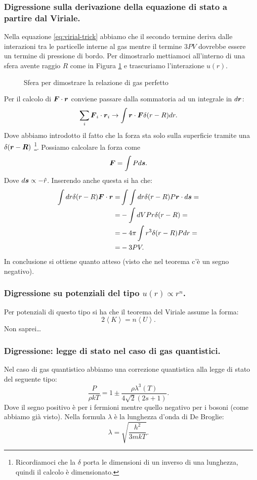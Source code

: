 \subsubsection{Digressione sulla derivazione della equazione di stato a partire dal Viriale.}
\label{subsubsec:Digressione sulla derivazione della equazione di stato a partire dal Viriale.}
Nella equazione \ref{eq:virial-trick} abbiamo che il secondo termine deriva dalle interazioni tra le particelle interne al gas mentre il termine $3PV$ dovrebbe essere un termine di pressione di bordo. Per dimostrarlo mettiamoci all'interno di una sfera avente raggio $R$ come in Figura \ref{fig:sfera-per-dimostrare-la-relazione-di-gas-perfetto} e trascuriamo l'interazione $u(r)$.
\begin{figure}[ht]
    \centering
    \caption{Sfera per dimostrare la relazione di gas perfetto}
    \label{fig:sfera-per-dimostrare-la-relazione-di-gas-perfetto}
\end{figure}
Per il calcolo di $\boldsymbol{F}\cdot\boldsymbol{r}$ conviene passare dalla sommatoria ad un integrale in $d \boldsymbol{r}$:
\[
	\sum_{i}^{} \boldsymbol{F}_i\cdot\boldsymbol{r}_{i} \to 
	\int\boldsymbol{r}\cdot\boldsymbol{F} \delta(r-R)dr
.\] 
Dove abbiamo introdotto il fatto che la forza sta solo sulla superficie tramite una $\delta(\boldsymbol{r}-\boldsymbol{R})$ \footnote{Ricordiamoci che la $\delta$ porta le dimensioni di un inverso di una lunghezza, quindi il calcolo è dimensionato.}.
Possiamo calcolare la forza come 
\[
	\boldsymbol{F} = \int P d \boldsymbol{s}
.\] 
Dove $d \boldsymbol{s} \propto - \hat{r}$.
Inserendo anche questa si ha che:
\[\begin{aligned}
	\int dr\delta(r-R)  \boldsymbol{F}\cdot\boldsymbol{r}
	=&
	\int\int dr\delta(r-R)P \boldsymbol{r}\cdot  d \boldsymbol{s} =\\
	=&
	-\int d V Pr \delta(r-R) =\\
	=&
	-4\pi\int r^3 \delta(r-R)P dr =\\
	=&
	-3PV
.\end{aligned}\]
In conclusione si ottiene quanto atteso (visto che nel teorema c'è un segno negativo).
\subsubsection{Digressione su potenziali del tipo $u(r) \propto r^n$.}
\label{subsubsec:Digressione su potenziali polinomiali.}
Per potenziali di questo tipo si ha che il teorema del Viriale assume la forma:
\[
	2\left<K \right> = n\left< U \right>
.\] 
Non saprei\ldots\\
\subsubsection{Digressione: legge di stato nel caso di gas quantistici.}
\label{subsubsec:Digressione: legge di stato nel caso di gas quantistici.}
Nel caso di gas quantistico abbiamo una correzione quantistica alla legge di stato del seguente tipo:
\[
	\frac{P}{\rho kT}
	=
	1 \pm \frac{\rho \lambda^3(T)}{4\sqrt{2} \left( 2s + 1 \right) }
.\] 
Dove il segno positivo è per i fermioni mentre quello negativo per i bosoni (come abbiamo già visto). Nella formula $\lambda$ è la lunghezza d'onda di De Broglie:
\[
	\lambda=\sqrt{\frac{h^2}{3mkT}} 
.\] 
